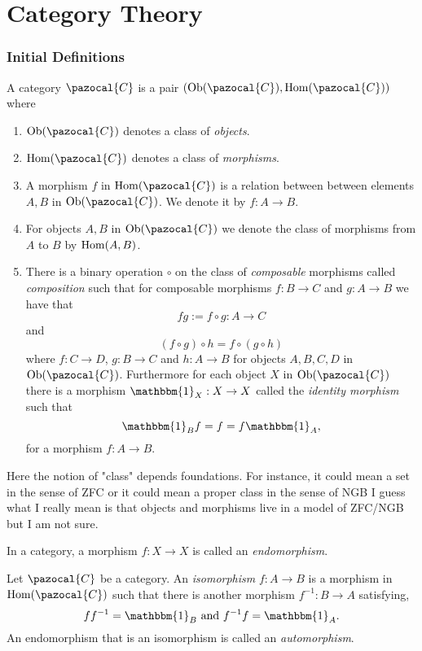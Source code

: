 \section{Category Theory}
\subsubsection{Initial Definitions}
\begin{definition}
    A category $\pazocal{C}$ is a pair $(\Ob(\pazocal{C}),\Hom(\pazocal{C}))$ where 
    \begin{enumerate} 
    \item $\Ob(\pazocal{C})$ denotes a class of \textit{objects}. \item $\Hom(\pazocal{C})$ denotes a class of \textit{morphisms}. 
    \item A morphism $f$ in $\Hom(\pazocal{C})$ is a relation between between elements $A,B$ in $\Ob(\pazocal{C})$. We denote it by $f : A \rightarrow B$. 
    \item For objects $A,B$ in $\Ob(\pazocal{C})$ we denote the class of morphisms from $A$ to $B$ by $\mathrm{Hom}(A,B)$.
    \item There is a binary operation $\circ$ on the class of \emph{composable} morphisms called \textit{composition} such that for composable morphisms $f: B\rightarrow C$ and $g : A \rightarrow B$ we have that
    $$fg := f\circ g : A \rightarrow C$$
    and 
    $$(f\circ g)\circ h = f\circ(g\circ h)$$
    where $f : C \rightarrow D$, $g: B \rightarrow C$ and $h: A \rightarrow B$ for objects $A,B,C,D$ in $\Ob(\pazocal{C})$. Furthermore for each object $X$ in $\Ob(\pazocal{C})$ there is a morphism $\mathbbm{1}_X : X \rightarrow X$ called the \textit{identity morphism} such that 
    $$\mathbbm{1}_B f = f = f \mathbbm{1}_A,$$
    for a morphism $f: A \rightarrow B$.
    \end{enumerate}
\end{definition}
\begin{remark}
    Here the notion of "class" depends foundations. For instance, it could mean a set in the sense of ZFC or it could mean a proper class in the sense of NGB {\Large I guess what I really mean is that objects and morphisms live in a model of ZFC/NGB but I am not sure}. 
\end{remark}
\begin{definition}
    In a category, a morphism $f : X\rightarrow X$ is called an \emph{endomorphism}.
\end{definition}
\begin{definition}
    Let $\pazocal{C}$ be a category. An \textit{isomorphism} $f:A \rightarrow B$ is a morphism in $\Hom(\pazocal{C})$ such that there is another morphism $f^{-1} : B\rightarrow A$ satisfying,
    $$ff^{-1} = \mathbbm{1}_B \ \mathrm{ and } \ f^{-1}f = \mathbbm{1}_A.$$
    An endomorphism that is an isomorphism is called an \emph{automorphism}. 
\end{definition}
